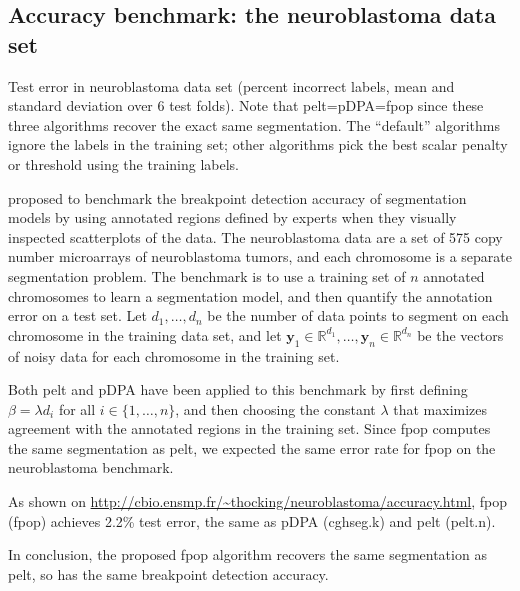 \documentclass{article}
\newcommand{\RR}{\mathbb R}
\begin{document}
\subsection{Accuracy benchmark: the neuroblastoma data set}

\begin{table}
  \centering
  \parbox{3in}{
    
  }
  \parbox{3in}{

    
  }
  \caption{Test error in neuroblastoma data set (percent incorrect labels,
    mean and standard deviation over 6 test folds). Note that pelt=pDPA=fpop 
    since these three algorithms recover the exact same segmentation.
    The ``default'' algorithms ignore the labels in the training set; 
    other algorithms pick the best scalar penalty or threshold
    using the training labels.}
  \label{tab:neuroblastoma-test-error}
\end{table}

\citet{HOCKING-breakpoints} proposed to benchmark the breakpoint
detection accuracy of segmentation models by using annotated regions
defined by experts when they visually inspected scatterplots of the
data. The neuroblastoma data are a set of 575 copy number microarrays
of neuroblastoma tumors, and each chromosome is a separate
segmentation problem. The benchmark is to use a training set of $n$
annotated chromosomes to learn a segmentation model, and then quantify
the annotation error on a test set. Let $d_1, \dots, d_n$ be the
number of data points to segment on each chromosome in the training
data set, and let $\mathbf y_1\in\RR^{d_1}, \dots, \mathbf
y_n\in\RR^{d_n}$ be the vectors of noisy data for each chromosome in
the training set.

Both pelt and pDPA have been applied to this benchmark by first
defining $\beta = \lambda d_i$ for all $i\in\{1, \dots, n\}$, and then
choosing the constant $\lambda$ that maximizes agreement with the
annotated regions in the training set. Since fpop computes the same
segmentation as pelt, we expected the same error rate for
fpop on the neuroblastoma benchmark.

As shown on
\url{http://cbio.ensmp.fr/~thocking/neuroblastoma/accuracy.html}, fpop
(fpop) achieves 2.2\% test error, the same as pDPA (cghseg.k) and pelt
(pelt.n).

In conclusion, the proposed fpop algorithm recovers the same
segmentation as pelt, so has the same breakpoint detection
accuracy.





\end{document}

